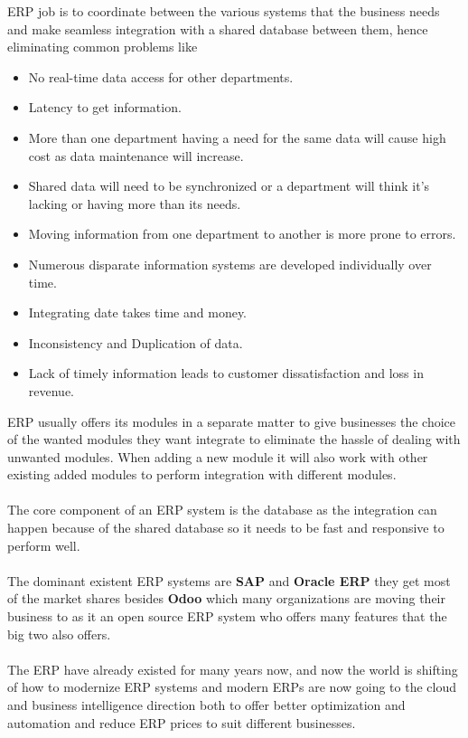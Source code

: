 ERP job is to coordinate between the various systems that the business needs and make seamless integration with a shared database between them, hence eliminating common problems like

\begin{itemize}
    \item No real-time data access for other departments.
    \item Latency to get information.
    \item More than one department having a need for the same data will cause high cost as data maintenance will increase.
    \item Shared data will need to be synchronized or a department will think it’s lacking or having more than its needs.
    \item Moving information from one department to another is more prone to errors.
    \item Numerous disparate information systems are developed individually over time.
    \item Integrating date takes time and money.
    \item Inconsistency and Duplication of data.
    \item Lack of timely information leads to customer dissatisfaction and loss in revenue.
\end{itemize}

ERP usually offers its modules in a separate matter to give businesses the choice of the wanted modules they want integrate 
to eliminate the hassle of dealing with unwanted modules. When adding a new module it will also work with other existing added modules to perform 
integration with different modules.\\\\
The core component of an ERP system is the database as the integration can happen because of the shared database so it needs to be fast and responsive to perform well.\\\\

The dominant existent ERP systems are \textbf{SAP} and \textbf{Oracle ERP} they get most of the market shares besides \textbf{Odoo} which many organizations are moving their business to 
as it an open source ERP system who offers many features that the big two also offers.\\\\

The ERP have already existed for many years now, and now the world is shifting of how to modernize ERP systems 
and modern ERPs are now going to the cloud and business intelligence direction both to offer better optimization and automation and reduce ERP prices to suit different businesses.



